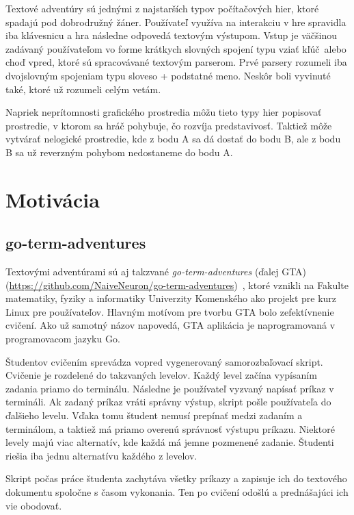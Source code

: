 Textové adventúry sú jednými z najstarších typov počítačových hier, ktoré spadajú
pod dobrodružný žáner. Používateľ využíva na interakciu v hre spravidla iba klávesnicu
a hra následne odpovedá textovým výstupom.
Vstup je väčšinou zadávaný používateľom vo forme krátkych slovných spojení
typu \glqq vziať kľúč\grqq~alebo \glqq choď vpred\grqq, ktoré sú spracovávané
textovým parserom. Prvé parsery rozumeli iba dvojslovným spojeniam typu sloveso + podstatné meno. Neskôr boli vyvinuté také, ktoré už rozumeli celým vetám.

Napriek neprítomnosti grafického prostredia môžu tieto typy hier popisovať prostredie, v ktorom sa hráč pohybuje, čo rozvíja predstavivosť. Taktiež môže vytvárať nelogické
prostredie, kde z bodu A sa dá dostať do bodu B, ale z bodu B sa už reverzným pohybom
nedostaneme do bodu A.~\cite{bib:adventures}


\section{Motivácia}
\label{sec:motivacia}

\subsection{go-term-adventures}
\label{sec:motivacia:gta}

Textovými adventúrami sú aj takzvané \textit{go-term-adventures} (ďalej GTA) (\url{https://github.com/NaiveNeuron/go-term-adventures})~\cite{bib:gta}, ktoré vznikli
na Fakulte matematiky, fyziky a informatiky Univerzity Komenského ako projekt pre kurz Linux pre používateľov. Hlavným motívom pre tvorbu GTA bolo zefektívnenie cvičení.
Ako už samotný názov napovedá, GTA aplikácia je naprogramovaná v programovacom
jazyku Go.

Študentov cvičením sprevádza vopred vygenerovaný samorozbaľovací skript. Cvičenie
je rozdelené do takzvaných levelov. Každý level začína vypísaním zadania priamo do
terminálu. Následne je používateľ vyzvaný napísať príkaz v termináli. Ak zadaný príkaz
vráti správny výstup, skript pošle používateľa do ďalšieho levelu. Vďaka tomu
študent nemusí prepínať medzi zadaním a terminálom, a taktiež má priamo overenú
správnosť výstupu príkazu. Niektoré levely majú viac alternatív, kde každá
má jemne pozmenené zadanie. Študenti riešia iba jednu alternatívu každého z levelov.

Skript počas práce študenta zachytáva všetky príkazy a zapisuje ich do textového
dokumentu spoločne s časom vykonania. Ten po cvičení odošlú a prednášajúci ich vie
obodovať.


